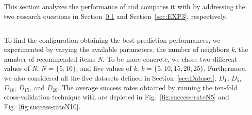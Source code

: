 This section analyzes the performance of \TF and compares it with \MNB by addressing the two research questions in Section~\ref{sec:EXP1} and Section~\ref{sec:EXP3}, respectively.



\subsection{\rqfirst} \label{sec:EXP1}
  
To find the configuration obtaining the best prediction performances, we experimented %
by varying the available parameters, \ie the number of neighbors \emph{k}, the number of recommended items \emph{N}. %
To be more concrete, we chose two different values of \emph{N}, \ie \emph{N} = $\{5, 10\}$, and five values of \emph{k}, \ie \emph{k} = $\{5, 10, 15, 20, 25\}$. Furthermore, we also considered all the five datasets defined in Section~\ref{sec:Dataset}, \ie $D_{1}$, $D_{5}$, $D_{10}$, $D_{15}$, and $D_{20}$. The average success rates obtained by running the ten-fold cross-validation technique with \TFa are depicted in Fig.~\ref{fig:success-rateN5} and Fig.~\ref{fig:success-rateN10}.

